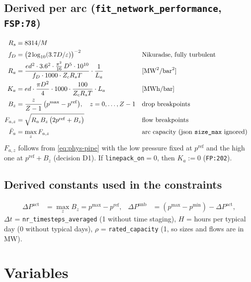 \documentclass[11pt,a4paper]{article}
\newcommand{\code}[1]{\texttt{#1}}
\newcommand{\pmin}{p^{\min}}
\newcommand{\pmax}{p^{\max}}
\newcommand{\pref}{p^{\mathrm{ref}}}
\newcommand{\dPa}{\Delta P^{\mathrm{act}}}
\newcommand{\dPu}{\Delta P^{\mathrm{unb}}}
\begin{document}
\subsection{Derived per arc (\code{fit\_network\_performance}, \code{FSP:78})}

\begin{align}
  R_s &= 8314/M
  \\
  f_D &= \bigl(2\log_{10}(3.7D/\varepsilon)\bigr)^{-2}
  && \text{Nikuradse, fully turbulent}\\
  R_a &= \frac{ed^2\cdot 3.6^2\cdot\frac{\pi^2}{16}\,D^5\cdot 10^{10}}
             {f_D\cdot 1000\cdot Z_c R_s T}\cdot\frac{1}{L_a}
  && [\text{MW}^2/\text{bar}^2]\\
  K_a &= ed\cdot\frac{\pi D^2}{4}\cdot 1000\cdot\frac{100}{Z_c R_s T}\cdot L_a
  && [\text{MWh}/\text{bar}]\\
  B_z &= \frac{z}{Z-1}\,\bigl(\pmax-\pref\bigr), \quad z=0,\dots,Z-1
  && \text{drop breakpoints}\\
  F_{a,z} &= \sqrt{R_a\,B_z\,\bigl(2\pref + B_z\bigr)}
  && \text{flow breakpoints}\\
  \bar F_a &= \max_z F_{a,z}
  && \text{arc capacity (json \code{size\_max} ignored)}
\end{align}
$F_{a,z}$ follows from \eqref{eq:phys-pipe} with the low pressure fixed at
$\pref$ and the high one at $\pref+B_z$ (decision D1). If
\code{linepack\_on}$=0$, then $K_a:=0$ (\code{FP:202}).

\subsection{Derived constants used in the constraints}

\begin{align}
  \dPa &= \max_z B_z = \pmax-\pref, &
  \dPu &= (\pmax-\pmin)-\dPa,
\end{align}
$\Delta t$ = \code{nr\_timesteps\_averaged} (1 without time staging),
$H$ = hours per typical day (0 without typical days),
$\rho$ = \code{rated\_capacity} (1, so sizes and flows are in MW).

\section{Variables}
\end{document}
